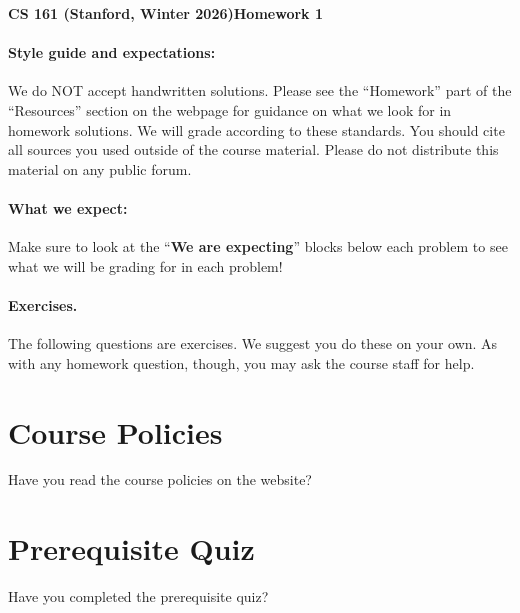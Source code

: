 \documentclass [12pt]{article}
\begin{document}
 

{\LARGE \textbf {CS 161 (Stanford, Winter 2026)}\hfill \textbf {Homework 1} } 

\vspace {1em} \begin {Instruction} \paragraph {Style guide and expectations:} We do NOT accept handwritten solutions. Please see the ``Homework'' part of the ``Resources'' section on the webpage for guidance on what we look for in homework solutions. We will grade according to these standards. You should cite all sources you used outside of the course material. Please do not distribute this material on any public forum. 

\paragraph {What we expect:} Make sure to look at the ``\textbf {We are expecting}'' blocks below each problem to see what we will be grading for in each problem! \end {Instruction} 

\vspace {1em} \begin {Instruction} \paragraph {Exercises.} The following questions are exercises. We suggest you do these on your own. As with any homework question, though, you may ask the course staff for help. \end {Instruction} 

\section {Course Policies } Have you read the course policies on the website? 


\begin{Solution}
\end{Solution}

\section {Prerequisite Quiz } Have you completed the prerequisite quiz? 

\end{document}
